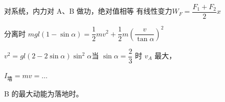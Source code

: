 对系统，内力对 A、B 做功，绝对值相等
有线性变力\quad $W_F=\dfrac{F_1+F_2}{2}x$
\begin{problem}[3]

\begin{solution}
分离时 $mgl(1-\sin\alpha)=\dfrac{1}{2}mv^2+\dfrac{1}{2}m\left(\dfrac{v}{\tan\alpha}\right)^2$

$v^2=gl(2-2\sin\alpha)\sin^2\alpha$\quad 当 $\sin\alpha=\dfrac{2}{3}$ 时 $v_A$ 最大，

$I_{\text{墙}}=mv=\ldots$

B 的最大动能为落地时。
\end{solution}
\end{problem}
